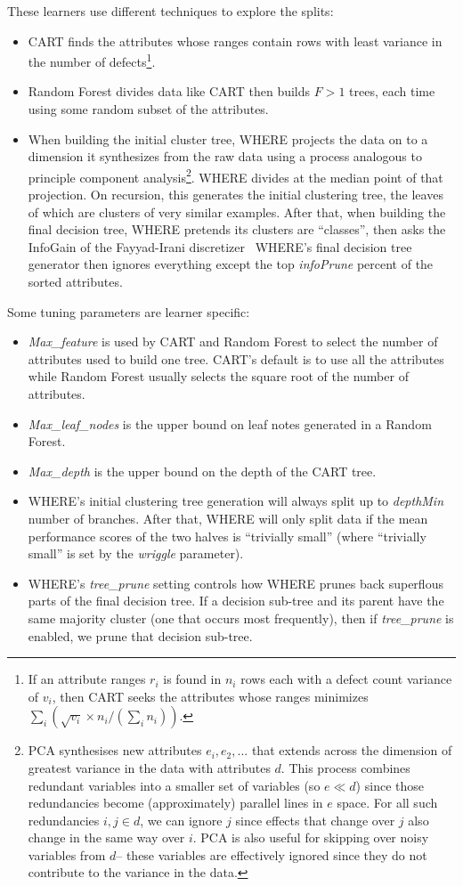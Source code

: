\documentclass{sig-alternative}
\newcommand{\bi}{\begin{itemize}[leftmargin=0.4cm]}
\newcommand{\ei}{\end{itemize}}
\begin{document}
These learners use different techniques to explore the splits:
\bi
\item
CART finds the attributes whose ranges contain rows with least variance in the number
of defects\footnote{If an attribute ranges $r_i$ is found in 
$n_i$ rows each with a  defect count variance of $v_i$, then CART seeks the attributes
whose ranges minimizes $\sum_i \left(\sqrt{v_i}\times n_i/(\sum_i n_i)\right)$.}.
\item
Random Forest    divides data like CART then  builds $F>1$  trees,
each time using some random subset of
the attributes. 
\item
When building the initial cluster tree, WHERE projects the data on to a dimension it synthesizes from the raw data using
a process analogous to principle component analysis\footnote{
PCA  synthesises  new
attributes $e_i, e_2,...$
that extends across the dimension of greatest  variance in the data  with attributes $d$.  
This process  combines
redundant  variables into a smaller set of variables  (so $e \ll d$) since those
redundancies become (approximately) parallel lines
in $e$ space. For all such redundancies \mbox{$i,j \in d$}, we 
can ignore $j$ 
since effects that change over $j$ also
change in the same way over $i$.
PCA is also useful for skipping over noisy variables from $d$-- these
variables are effectively ignored since    they  do not contribute to the variance in the data.}.
WHERE  divides  at the median point of that projection.
On recursion,
this generates the initial clustering tree, the leaves of which are clusters of  very similar examples. After that, when building 
the final decision tree, WHERE pretends its clusters are ``classes'', then 
asks the InfoGain of the
Fayyad-Irani discretizer~
WHERE's final decision tree generator then ignores everything except the top   {\em infoPrune} percent of the sorted
attributes.
\ei
Some tuning parameters are learner specific:
\bi
\item
{\em Max\_feature} is used by
CART and Random Forest to select the number of attributes
used to build one tree.
CART's default is to use all the attributes while 
Random Forest usually selects the square root of the number
of attributes.
\item
  {\em Max\_leaf\_nodes} is the upper bound on leaf notes generated in a 
  Random Forest.
\item {\em Max\_depth} is the upper bound on the depth of the CART tree.  
 \item
WHERE's initial clustering
tree generation will always split up to {\em depthMin} number of branches.
After that, WHERE will only split data if the mean performance scores of the two halves
is ``trivially small'' (where ``trivially small'' is set by the   {\em wriggle} parameter). 
\item
WHERE's   {\em tree\_prune} setting controls how   
WHERE prunes back superflous parts of the final decision tree. 
If a decision sub-tree and its parent have the same 
majority cluster
(one that occurs most frequently), then if {\em tree\_prune} is enabled, we prune that decision sub-tree.
\ei
\end{document}
